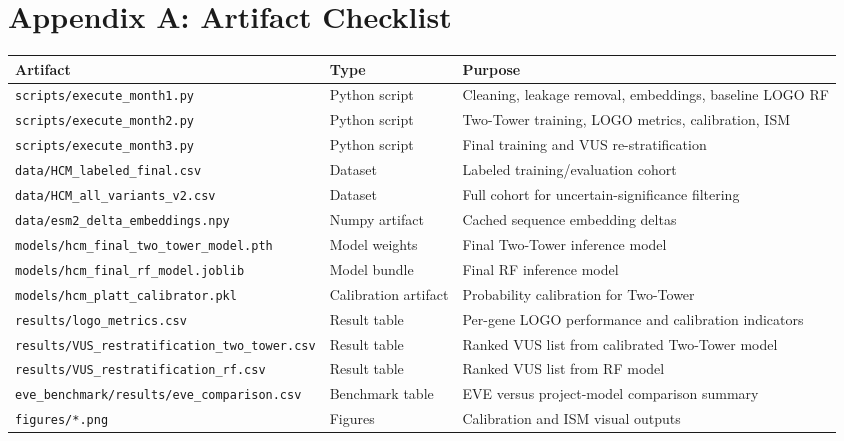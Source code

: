 \documentclass[11pt,a4paper]{article}
\begin{document}
\section*{Appendix A: Artifact Checklist}
\begin{longtable}{p{} p{} p{}}
\toprule
\textbf{Artifact} & \textbf{Type} & \textbf{Purpose} \\
\midrule
\texttt{scripts/execute\_month1.py} & Python script & Cleaning, leakage removal, embeddings, baseline LOGO RF \\
\texttt{scripts/execute\_month2.py} & Python script & Two-Tower training, LOGO metrics, calibration, ISM \\
\texttt{scripts/execute\_month3.py} & Python script & Final training and VUS re-stratification \\
\texttt{data/HCM\_labeled\_final.csv} & Dataset & Labeled training/evaluation cohort \\
\texttt{data/HCM\_all\_variants\_v2.csv} & Dataset & Full cohort for uncertain-significance filtering \\
\texttt{data/esm2\_delta\_embeddings.npy} & Numpy artifact & Cached sequence embedding deltas \\
\texttt{models/hcm\_final\_two\_tower\_model.pth} & Model weights & Final Two-Tower inference model \\
\texttt{models/hcm\_final\_rf\_model.joblib} & Model bundle & Final RF inference model \\
\texttt{models/hcm\_platt\_calibrator.pkl} & Calibration artifact & Probability calibration for Two-Tower \\
\texttt{results/logo\_metrics.csv} & Result table & Per-gene LOGO performance and calibration indicators \\
\texttt{results/VUS\_restratification\_two\_tower.csv} & Result table & Ranked VUS list from calibrated Two-Tower model \\
\texttt{results/VUS\_restratification\_rf.csv} & Result table & Ranked VUS list from RF model \\
\texttt{eve\_benchmark/results/eve\_comparison.csv} & Benchmark table & EVE versus project-model comparison summary \\
\texttt{figures/*.png} & Figures & Calibration and ISM visual outputs \\
\bottomrule
\end{longtable}
\end{document}
